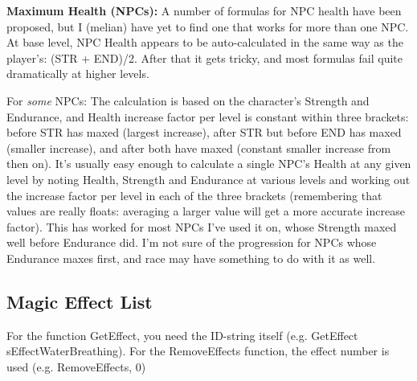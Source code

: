 \documentclass[
]{article}
\begin{document}
\textbf{Maximum Health (NPCs):} A number of formulas for NPC health have
been proposed, but I (melian) have yet to find one that works for more
than one NPC. At base level, NPC Health appears to be auto-calculated in
the same way as the player's: (STR + END)/2. After that it gets tricky,
and most formulas fail quite dramatically at higher levels.

For \emph{some} NPCs: The calculation is based on the character's
Strength and Endurance, and Health increase factor per level is constant
within three brackets: before STR has maxed (largest increase), after
STR but before END has maxed (smaller increase), and after both have
maxed (constant smaller increase from then on). It's usually easy enough
to calculate a single NPC's Health at any given level by noting Health,
Strength and Endurance at various levels and working out the increase
factor per level in each of the three brackets (remembering that values
are really floats: averaging a larger value will get a more accurate
increase factor). This has worked for most NPCs I've used it on, whose
Strength maxed well before Endurance did. I'm not sure of the
progression for NPCs whose Endurance maxes first, and race may have
something to do with it as well.\protect\hypertarget{_Toc53412751}{}{}

\hypertarget{magic-effect-list}{%
\subsection{Magic Effect List}\label{magic-effect-list}}

For the function GetEffect, you need the ID-string itself (e.g.
GetEffect sEffectWaterBreathing). For the RemoveEffects function, the
effect number is used (e.g. RemoveEffects, 0)
\end{document}
